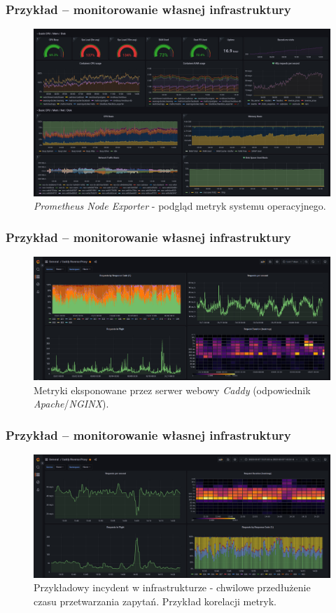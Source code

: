 \documentclass[]{beamer}
\begin{document}
\begin{frame}
  \frametitle{Przykład -- monitorowanie własnej infrastruktury}
  \begin{figure}
    \centering
    \includegraphics[width=1.0\linewidth]{grafana_node_exporter.jpg}
    \caption{\textit{Prometheus Node Exporter} - podgląd metryk systemu operacyjnego.}
  \end{figure}
\end{frame}

\begin{frame}
  \frametitle{Przykład -- monitorowanie własnej infrastruktury}
  \begin{figure}
    \centering
    \includegraphics[width=1.0\linewidth]{grafana_caddy.jpg}
    \caption{Metryki eksponowane przez serwer webowy \textit{Caddy} (odpowiednik \textit{Apache}/\textit{NGINX}).}
  \end{figure}
\end{frame}

\begin{frame}
  \frametitle{Przykład -- monitorowanie własnej infrastruktury}
  \begin{figure}
    \centering
    \includegraphics[width=1.0\linewidth]{grafana_caddy_example_incident.jpg}
    \caption{Przykładowy incydent w infrastrukturze - chwilowe przedłużenie czasu przetwarzania zapytań. Przykład korelacji metryk.}
  \end{figure}
\end{frame}
\end{document}
